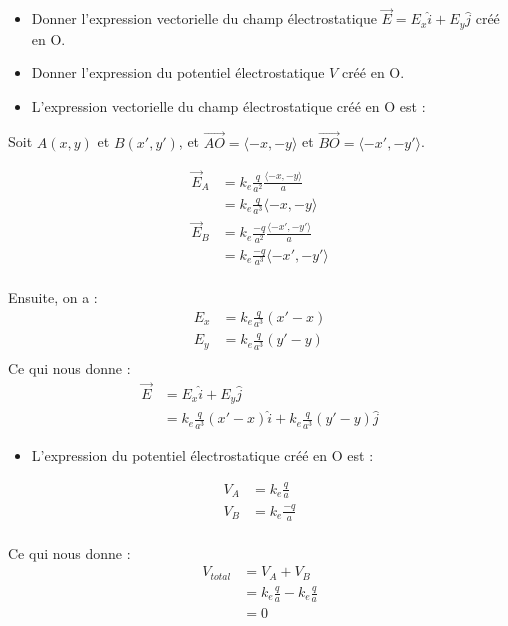 \documentclass[12pt]{article}
\begin{document}
\begin{itemize}
	\item Donner l'expression vectorielle du champ électrostatique $\vec{E} = E_x \hat{i} + E_y \hat{j}$ créé en O.
	\item Donner l'expression du potentiel électrostatique $V$ créé en O.
\end{itemize}

\begin{correctionbox}
	\begin{itemize}
		\item L'expression vectorielle du champ électrostatique créé en O est :
	\end{itemize}

	\noindent Soit $A(x,y)$ et $B(x',y')$, et $\vec{AO} = \langle -x, -y \rangle$ et $\vec{BO} = \langle -x', -y' \rangle$.

	\begin{align*}
		\vec{E}_A & = k_e \frac{q}{a^2} \frac{\langle -x, -y \rangle}{a}    \\
		          & = k_e \frac{q}{a^3} \langle -x, -y \rangle              \\
		\vec{E}_B & = k_e \frac{-q}{a^2} \frac{\langle -x', -y' \rangle}{a} \\
		          & = k_e \frac{-q}{a^3} \langle -x', -y' \rangle           \\
	\end{align*}

	\noindent Ensuite, on a :
	\begin{align*}
		E_x & = k_e \frac{q}{a^3} (x' - x) \\
		E_y & = k_e \frac{q}{a^3} (y' - y) \\
	\end{align*}
	\noindent Ce qui nous donne :
	\begin{align*}
		\vec{E} & = E_x \hat{i} + E_y \hat{j}                                               \\
		        & = k_e \frac{q}{a^3} (x' - x) \hat{i} + k_e \frac{q}{a^3} (y' - y) \hat{j}
	\end{align*}
\end{correctionbox}

\begin{correctionbox}
	\begin{itemize}
		\item L'expression du potentiel électrostatique créé en O est :
	\end{itemize}

	\begin{align*}
		V_A & = k_e \frac{q}{a}  \\
		V_B & = k_e \frac{-q}{a} \\
	\end{align*}

	\noindent Ce qui nous donne :
	\begin{align*}
		V_{total} & = V_A + V_B                          \\
		          & = k_e \frac{q}{a} -  k_e \frac{q}{a} \\
		          & = 0
	\end{align*}
\end{correctionbox}
\end{document}
